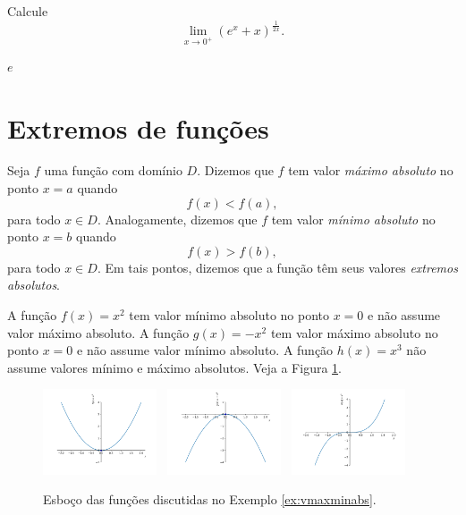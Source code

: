 \begin{exer}
  Calcule
  \begin{equation}
    \lim_{x\to 0^+} \left(e^x + x\right)^{\frac{1}{2x}}.
  \end{equation}
\end{exer}
\begin{resp}
  $e$
\end{resp}

\section{Extremos de funções}\label{cap_apderiv_sec_extfun}

Seja $f$ uma função com domínio $D$. Dizemos que $f$ tem valor \emph{máximo absoluto} no ponto $x=a$ quando
\begin{equation}
  f(x) < f(a),
\end{equation}
para todo $x\in D$. Analogamente, dizemos que $f$ tem valor \emph{mínimo absoluto} no ponto $x=b$ quando
\begin{equation}
  f(x) > f(b),
\end{equation}
para todo $x\in D$. Em tais pontos, dizemos que a função têm seus valores \emph{extremos absolutos}.

\begin{ex}\label{ex:vmaxminabs}
  A função $f(x) = x^2$ tem valor mínimo absoluto no ponto $x=0$ e não assume valor máximo absoluto. A função $g(x) = -x^2$ tem valor máximo absoluto no ponto $x=0$ e não assume valor mínimo absoluto. A função $h(x)=x^3$ não assume valores mínimo e máximo absolutos. Veja a Figura \ref{fig:ex_vmaxminabs}.

  \begin{figure}[H]
    \centering
    \includegraphics[width=0.3\textwidth]{./cap_apderiv/dados/fig_ex_vmaxminabs/fig_f}~
    \includegraphics[width=0.3\textwidth]{./cap_apderiv/dados/fig_ex_vmaxminabs/fig_g}~
    \includegraphics[width=0.3\textwidth]{./cap_apderiv/dados/fig_ex_vmaxminabs/fig_h}
    \caption{Esboço das funções discutidas no Exemplo \ref{ex:vmaxminabs}.}
    \label{fig:ex_vmaxminabs}
  \end{figure}
\end{ex}

